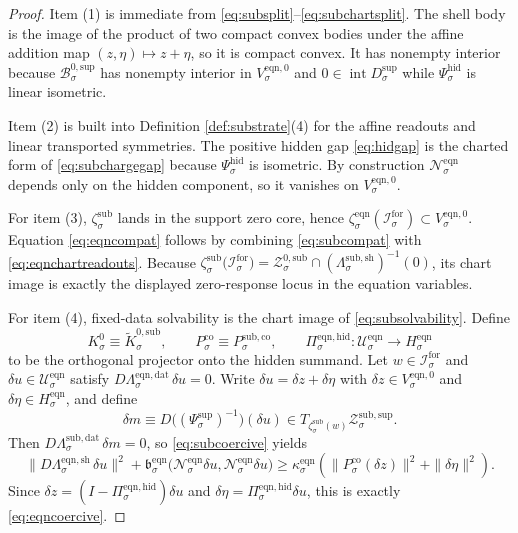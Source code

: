 \documentclass[11pt]{article}
\newcommand{\ForSpace}[1]{\mathcal I_{#1}^{\mathrm{for}}}
\newcommand{\EqnSpace}[1]{\mathcal U_{#1}^{\mathrm{eqn}}}
\newcommand{\EqnData}[1]{\Lambda_{#1}^{\mathrm{eqn,dat}}}
\newcommand{\EqnShell}[1]{\Lambda_{#1}^{\mathrm{eqn,sh}}}
\newcommand{\EqnPair}[1]{\mathfrak b_{#1}^{\mathrm{eqn}}}
\newcommand{\EqnZero}[1]{V_{#1}^{\mathrm{eqn},0}}
\newcommand{\EqnHidden}[1]{H_{#1}^{\mathrm{eqn}}}
\newcommand{\EqnProj}[1]{\Pi_{#1}^{\mathrm{eqn,hid}}}
\newcommand{\EqnLin}[1]{\mathcal N_{#1}^{\mathrm{eqn}}}
\newcommand{\EqnEmbed}[1]{\zeta_{#1}^{\mathrm{eqn}}}
\newcommand{\SeedHiddenBody}[1]{D_{#1}^{\mathrm{sup}}}
\newcommand{\ShellChart}[1]{\Psi_{#1}^{\mathrm{sup}}}
\newcommand{\HiddenChart}[1]{\Psi_{#1}^{\mathrm{hid}}}
\newcommand{\ZeroBody}[1]{\mathcal B_{#1}^{0,\mathrm{sup}}}
\newcommand{\Kernel}[1]{K_{#1}^{0}}
\newcommand{\StateComp}[1]{P_{#1}^{\mathrm{co}}}
\newcommand{\SubData}[1]{\Lambda_{#1}^{\mathrm{sub,dat}}}
\newcommand{\SubShellMap}[1]{\Lambda_{#1}^{\mathrm{sub,sh}}}
\newcommand{\SubSupportShell}[1]{\mathcal Z_{#1}^{\mathrm{sub,sup}}}
\newcommand{\SubZeroCore}[1]{\mathcal Z_{#1}^{0,\mathrm{sub}}}
\newcommand{\SubEmbed}[1]{\zeta_{#1}^{\mathrm{sub}}}
\newcommand{\SubKernelCh}[1]{\widetilde K_{#1}^{0,\mathrm{sub}}}
\newcommand{\SubStateComp}[1]{P_{#1}^{\mathrm{sub,co}}}
\begin{document}
\begin{proof}
Item (1) is immediate from \eqref{eq:subsplit}--\eqref{eq:subchartsplit}. The shell body is the image of the product of two compact convex bodies under the affine addition map \((z,\eta)\mapsto z+\eta\), so it is compact convex. It has nonempty interior because \(\ZeroBody{\sigma}\) has nonempty interior in \(\EqnZero{\sigma}\) and \(0\in\operatorname{int}\SeedHiddenBody{\sigma}\) while \(\HiddenChart{\sigma}\) is linear isometric.

Item (2) is built into Definition \ref{def:substrate}(4) for the affine readouts and linear transported symmetries. The positive hidden gap \eqref{eq:hidgap} is the charted form of \eqref{eq:subchargegap} because \(\HiddenChart{\sigma}\) is isometric. By construction \(\EqnLin{\sigma}\) depends only on the hidden component, so it vanishes on \(\EqnZero{\sigma}\).

For item (3), \(\SubEmbed{\sigma}\) lands in the support zero core, hence \(\EqnEmbed{\sigma}(\ForSpace{\sigma})\subset\EqnZero{\sigma}\). Equation \eqref{eq:eqncompat} follows by combining \eqref{eq:subcompat} with \eqref{eq:eqnchartreadouts}. Because \(\SubEmbed{\sigma}\bigl(\ForSpace{\sigma}\bigr)=\SubZeroCore{\sigma}\cap(\SubShellMap{\sigma})^{-1}(0)\), its chart image is exactly the displayed zero-response locus in the equation variables.

For item (4), fixed-data solvability is the chart image of \eqref{eq:subsolvability}. Define
\[
\Kernel{\sigma}
\equiv
\SubKernelCh{\sigma},
\qquad
\StateComp{\sigma}
\equiv
\SubStateComp{\sigma},
\qquad
\EqnProj{\sigma}:\EqnSpace{\sigma}\to\EqnHidden{\sigma}
\]
to be the orthogonal projector onto the hidden summand. Let \(w\in\ForSpace{\sigma}\) and \(\delta u\in\EqnSpace{\sigma}\) satisfy \(D\EqnData{\sigma}\,\delta u=0\). Write \(\delta u=\delta z+\delta\eta\) with \(\delta z\in\EqnZero{\sigma}\) and \(\delta\eta\in\EqnHidden{\sigma}\), and define
\[
\delta m
\equiv
D\bigl((\ShellChart{\sigma})^{-1}\bigr)(\delta u)
\in
T_{\SubEmbed{\sigma}(w)}\SubSupportShell{\sigma}.
\]
Then \(D\SubData{\sigma}\,\delta m=0\), so \eqref{eq:subcoercive} yields
\[
\|D\EqnShell{\sigma}\,\delta u\|^{2}
+
\EqnPair{\sigma}\bigl(\EqnLin{\sigma}\delta u,\EqnLin{\sigma}\delta u\bigr)
\ge
\kappa_{\sigma}^{\mathrm{eqn}}
\left(
\|\StateComp{\sigma}(\delta z)\|^{2}
+
\|\delta\eta\|^{2}
\right).
\]
Since \(\delta z=(I-\EqnProj{\sigma})\delta u\) and \(\delta\eta=\EqnProj{\sigma}\delta u\), this is exactly \eqref{eq:eqncoercive}.


\end{proof}
\end{document}
